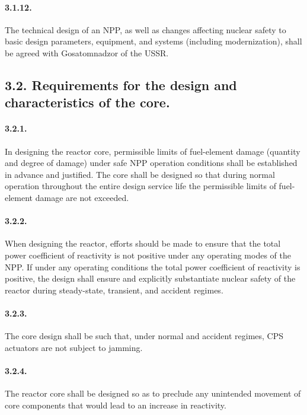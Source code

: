 \documentclass[openright]{bookest}
\begin{document}
\paragraph{3.1.12.} The technical design of an NPP, as well as changes affecting nuclear safety to basic design parameters, equipment, and systems (including modernization), shall be agreed with Gosatomnadzor of the USSR.

\subsection*{3.2. Requirements for the design and characteristics of the core.}

\paragraph{3.2.1.} In designing the reactor core, permissible limits of fuel-element damage (quantity and degree of damage) under safe NPP operation conditions shall be established in advance and justified. The core shall be designed so that during normal operation throughout the entire design service life the permissible limits of fuel-element damage are not exceeded.

\paragraph{3.2.2.} When designing the reactor, efforts should be made to ensure that the total power coefficient of reactivity is not positive under any operating modes of the NPP. If under any operating conditions the total power coefficient of reactivity is positive, the design shall ensure and explicitly substantiate nuclear safety of the reactor during steady-state, transient, and accident regimes.

\paragraph{3.2.3.} The core design shall be such that, under normal and accident regimes, CPS actuators are not subject to jamming.

\paragraph{3.2.4.} The reactor core shall be designed so as to preclude any unintended movement of core components that would lead to an increase in reactivity.
\end{document}
